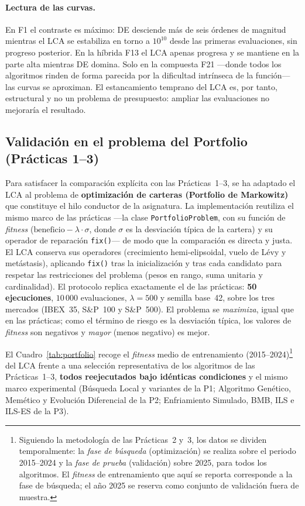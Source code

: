 \paragraph{Lectura de las curvas.}
En F1 el contraste es máximo: DE desciende más de seis órdenes de magnitud mientras el LCA se
estabiliza en torno a $10^{10}$ desde las primeras evaluaciones, sin progreso posterior. En la
híbrida F13 el LCA apenas progresa y se mantiene en la parte alta mientras DE domina. Solo en la compuesta
F21 ---donde todos los algoritmos rinden de forma parecida por la dificultad intrínseca de la
función--- las curvas se aproximan. El estancamiento temprano del LCA es, por tanto,
estructural y no un problema de presupuesto: ampliar las evaluaciones no mejoraría el
resultado.

\subsection{Validación en el problema del Portfolio (Prácticas 1--3)}
\label{sec:portfolio}

Para satisfacer la comparación explícita con las Prácticas~1--3, se ha adaptado el
LCA al problema de \textbf{optimización de carteras (Portfolio de Markowitz)} que
constituye el hilo conductor de la asignatura. La implementación reutiliza el
mismo marco de las prácticas ---la clase \texttt{PortfolioProblem}, con su función
de \emph{fitness} ($\text{beneficio}-\lambda\cdot\sigma$, donde $\sigma$ es la
desviación típica de la cartera) y su operador de reparación \texttt{fix()}--- de
modo que la comparación es directa y justa. El LCA conserva sus operadores
(crecimiento hemi-elipsoidal, vuelo de Lévy y metástasis), aplicando \texttt{fix()}
tras la inicialización y tras cada candidato para respetar las restricciones del
problema (pesos en rango, suma unitaria y cardinalidad). El protocolo replica
exactamente el de las prácticas: \textbf{50 ejecuciones}, $10\,000$ evaluaciones,
$\lambda=500$ y semilla base~42, sobre los tres mercados (IBEX~35, S\&P~100 y
S\&P~500). El problema se \emph{maximiza}, igual que en las prácticas; como el
término de riesgo es la desviación típica, los valores de \emph{fitness} son
negativos y \emph{mayor} (menos negativo) es mejor.

El Cuadro~\ref{tab:portfolio} recoge el \emph{fitness} medio de entrenamiento
(2015--2024)\footnote{Siguiendo la metodología de las Prácticas~2 y~3, los datos se
dividen temporalmente: la \emph{fase de búsqueda} (optimización) se realiza sobre el
periodo 2015--2024 y la \emph{fase de prueba} (validación) sobre 2025, para todos los
algoritmos. El \emph{fitness} de entrenamiento que aquí se reporta corresponde a la
fase de búsqueda; el año 2025 se reserva como conjunto de validación fuera de muestra.}
del LCA frente a una selección representativa de los algoritmos de las
Prácticas~1--3, \textbf{todos reejecutados bajo idénticas condiciones} y el mismo
marco experimental (Búsqueda Local y variantes de la P1; Algoritmo Genético,
Memético y Evolución Diferencial de la P2; Enfriamiento Simulado, BMB, ILS e
ILS-ES de la P3).

